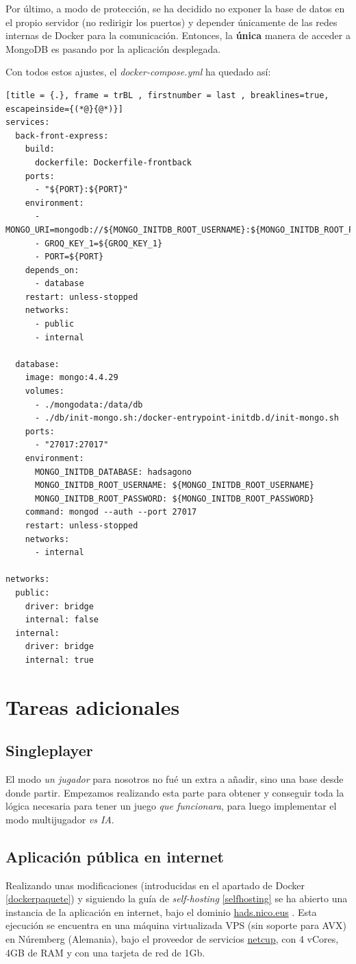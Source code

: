 \documentclass[12pt,epsf,titlepage,a4paper]{article}
\begin{document}
Por último, a modo de protección, se ha decidido no exponer la base de datos en el propio servidor (no redirigir los puertos) y depender únicamente de las redes internas de Docker para la comunicación. Entonces, la \textbf{única} manera de acceder a MongoDB es pasando por la aplicación desplegada.

Con todos estos ajustes, el \emph{docker-compose.yml} ha quedado así:

    \begin{lstlisting}[title = {.}, frame = trBL , firstnumber = last , breaklines=true, escapeinside={(*@}{@*)}]
services:
  back-front-express:
    build:
      dockerfile: Dockerfile-frontback
    ports:
      - "${PORT}:${PORT}"
    environment:
      - MONGO_URI=mongodb://${MONGO_INITDB_ROOT_USERNAME}:${MONGO_INITDB_ROOT_PASSWORD}@database:27017/hadsagono
      - GROQ_KEY_1=${GROQ_KEY_1}
      - PORT=${PORT}
    depends_on:
      - database
    restart: unless-stopped
    networks:
      - public
      - internal

  database:
    image: mongo:4.4.29
    volumes:
      - ./mongodata:/data/db
      - ./db/init-mongo.sh:/docker-entrypoint-initdb.d/init-mongo.sh
    ports:
      - "27017:27017"
    environment:
      MONGO_INITDB_DATABASE: hadsagono
      MONGO_INITDB_ROOT_USERNAME: ${MONGO_INITDB_ROOT_USERNAME}
      MONGO_INITDB_ROOT_PASSWORD: ${MONGO_INITDB_ROOT_PASSWORD}
    command: mongod --auth --port 27017
    restart: unless-stopped
    networks:
      - internal

networks:
  public:
    driver: bridge
    internal: false
  internal:
    driver: bridge
    internal: true
    \end{lstlisting}

\pagebreak
\section{Tareas adicionales}

\subsection{Singleplayer}

El modo \emph{un jugador} para nosotros no fué un extra a añadir, sino una base desde donde partir. Empezamos realizando esta parte para obtener y conseguir toda la lógica necesaria para tener un juego \emph{que funcionara}, para luego implementar el modo multijugador \emph{vs IA}.

\subsection{Aplicación pública en internet} \label{extraselfhost}
Realizando unas modificaciones (introducidas en el apartado de Docker \ref{dockerpaquete}) y siguiendo la guía de \emph{self-hosting} \ref{selfhosting} se ha abierto una instancia de la aplicación en internet, bajo el dominio \href{https://hads.nico.eus}{hads.nico.eus} . Esta ejecución se encuentra en una máquina virtualizada VPS (sin soporte para  AVX) en Núremberg (Alemania), bajo el proveedor de servicios \href{https://netcup.eu}{netcup}, con 4 vCores, 4GB de RAM y con una tarjeta de red de 1Gb.
\end{document}
